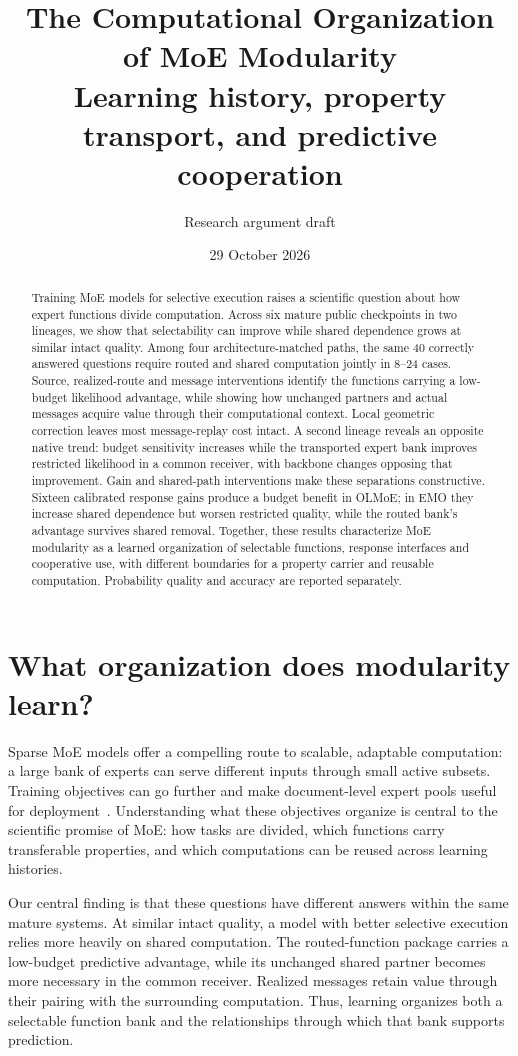\documentclass[10pt,twocolumn]{article}
\title{The Computational Organization of MoE Modularity\\
\large Learning history, property transport, and predictive cooperation}
\author{Research argument draft}
\date{29 October 2026}
\begin{document}
\maketitle
\begin{abstract}
Training MoE models for selective execution raises a scientific question about how expert functions divide computation.
Across six mature public checkpoints in two lineages, we show that selectability can improve while shared dependence grows at similar intact quality.
Among four architecture-matched paths, the same 40 correctly answered questions require routed and shared computation jointly in 8--24 cases.
Source, realized-route and message interventions identify the functions carrying a low-budget likelihood advantage, while showing how unchanged partners and actual messages acquire value through their computational context.
Local geometric correction leaves most message-replay cost intact.
A second lineage reveals an opposite native trend: budget sensitivity increases while the transported expert bank improves restricted likelihood in a common receiver, with backbone changes opposing that improvement.
Gain and shared-path interventions make these separations constructive.
Sixteen calibrated response gains produce a budget benefit in OLMoE; in EMO they increase shared dependence but worsen restricted quality, while the routed bank's advantage survives shared removal.
Together, these results characterize MoE modularity as a learned organization of selectable functions, response interfaces and cooperative use, with different boundaries for a property carrier and reusable computation.
Probability quality and accuracy are reported separately.
\end{abstract}

\section{What organization does modularity learn?}
Sparse MoE models offer a compelling route to scalable, adaptable computation: a large bank of experts can serve different inputs through small active subsets.
Training objectives can go further and make document-level expert pools useful for deployment~\cite{emo}.
Understanding what these objectives organize is central to the scientific promise of MoE: how tasks are divided, which functions carry transferable properties, and which computations can be reused across learning histories.

Our central finding is that these questions have different answers within the same mature systems.
At similar intact quality, a model with better selective execution relies more heavily on shared computation.
The routed-function package carries a low-budget predictive advantage, while its unchanged shared partner becomes more necessary in the common receiver.
Realized messages retain value through their pairing with the surrounding computation.
Thus, learning organizes both a selectable function bank and the relationships through which that bank supports prediction.
\end{document}
